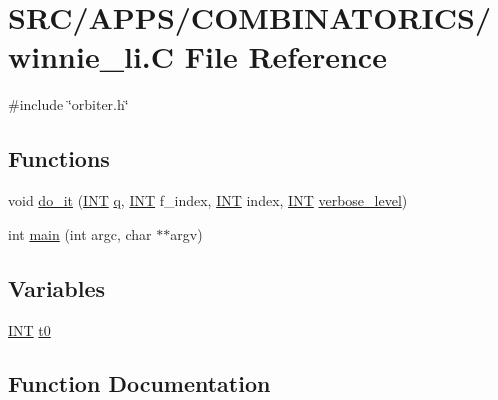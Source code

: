 \hypertarget{winnie__li_8_c}{}\section{S\+R\+C/\+A\+P\+P\+S/\+C\+O\+M\+B\+I\+N\+A\+T\+O\+R\+I\+C\+S/winnie\+\_\+li.C File Reference}
\label{winnie__li_8_c}
{\ttfamily \#include \char`\"{}orbiter.\+h\char`\"{}}\newline
\subsection*{Functions}
\begin{DoxyCompactItemize}
\item 
void \mbox{\hyperlink{winnie__li_8_c_a4a76e267a3647d5cb54c640a98ef405e}{do\+\_\+it}} (\mbox{\hyperlink{galois_8h_a09fddde158a3a20bd2dcadb609de11dc}{I\+NT}} \mbox{\hyperlink{simeon_8_c_a92cbb483a3b27ae1a0dbfcb125ce216f}{q}}, \mbox{\hyperlink{galois_8h_a09fddde158a3a20bd2dcadb609de11dc}{I\+NT}} f\+\_\+index, \mbox{\hyperlink{galois_8h_a09fddde158a3a20bd2dcadb609de11dc}{I\+NT}} index, \mbox{\hyperlink{galois_8h_a09fddde158a3a20bd2dcadb609de11dc}{I\+NT}} \mbox{\hyperlink{simeon_8_c_a818073fbcc2f439e7c56952f67386122}{verbose\+\_\+level}})
\item 
int \mbox{\hyperlink{winnie__li_8_c_a3c04138a5bfe5d72780bb7e82a18e627}{main}} (int argc, char $\ast$$\ast$argv)
\end{DoxyCompactItemize}
\subsection*{Variables}
\begin{DoxyCompactItemize}
\item 
\mbox{\hyperlink{galois_8h_a09fddde158a3a20bd2dcadb609de11dc}{I\+NT}} \mbox{\hyperlink{winnie__li_8_c_a4268f4fe222ffb119218a0199f5e1904}{t0}}
\end{DoxyCompactItemize}


\subsection{Function Documentation}
\mbox{\label{winnie__li_8_c_a4a76e267a3647d5cb54c640a98ef405e}} 
